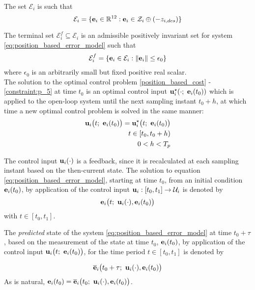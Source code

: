 The set $\mathcal{E}_i$ is such that
$$\mathcal{E}_i = \{\bm{\mathbf{e}}_i \in \mathbb{R}^{12} : \bm{\mathbf{e}}_i \in \mathcal{Z}_i \oplus (-z_{i,des} )\}$$

The terminal set $\mathcal{E}_i^f \subseteq \mathcal{E}_i$ is an admissible
positively invariant set  for system
\eqref{eq:position_based_error_model} such that
\begin{align}
  \mathcal{E}_i^f = \{\bm{\mathbf{e}}_i \in \mathcal{E}_i : \|\bm{\mathbf{e}}_i\| \leq \epsilon_0 \}
\end{align}
where $\epsilon_0$ is an arbitrarily small but fixed positive real scalar.\\

The solution to the optimal control problem \eqref{position_based_cost} -
\eqref{constraint:p_5} at time $t_0$ is an optimal control input
$\bm{\mathbf{u}}_i^{\star}(\cdot;\ \bm{\mathbf{e}}_i(t_0))$ which
is applied to the open-loop system until the next sampling instant $t_0 + h$,
at which time a new optimal control problem is solved in the same manner:
\begin{align}
  \vect{u}_i\big(t;\ \vect{e}_i(t_0)\big) = \vect{u}_i^{\star}\big(t;\ \vect{e}_i(t_0)\big) \label{eq:position_based_optimal_u} \\
  t \in [t_0, t_0 + h) \nonumber \\
  0 < h < T_p \nonumber
\end{align}

The control input $\bm{\mathbf{u}}_i(\cdot)$ is a feedback, since it is
recalculated at each sampling instant based on the then-current state. The
solution to equation \eqref{eq:position_based_error_model}, starting at time
$t_0$, from an initial condition $\bm{\mathbf{e}}_i(t_0)$, by application of the
control input $\bm{\mathbf{u}}_i : [t_0, t_1] \to \mathcal{U}_i$ is denoted by
$$\bm{\mathbf{e}}_i\big(t;\ \bm{\mathbf{u}}_i(\cdot), \bm{\mathbf{e}}_i(t_0)\big)$$
with $t \in [t_0, t_1]$.

The \textit{predicted} state of the system \eqref{eq:position_based_error_model}
at time $t_0 + \tau$, based on the measurement of the state at time
$t_0$, $\bm{\mathbf{e}}_i(t_0)$, by application of the control input
$\vect{u}_i\big(t;\ \vect{e}_i(t_0)\big)$, for the time period $t \in [t_0, t_1]$
is denoted by

\begin{align}
  \overline{\bm{\mathbf{e}}}_i\big(t_0 + \tau;\ \bm{\mathbf{u}}_i(\cdot), \bm{\mathbf{e}}_i(t_0)\big) \label{eq:position_based_predicted_error_0}
\end{align}
As is natural,
$\vect{e}_i(t_0) = \overline{\vect{e}}_i\big(t_0;\ \vect{u}_i(\cdot), \vect{e}_i(t_0)\big)$.\\

